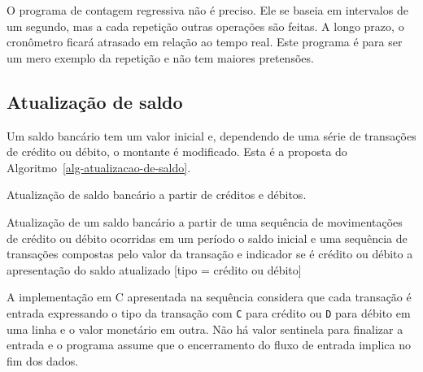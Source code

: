 \documentclass[
  11pt,
  a4paper,
]{scrbook}
\begin{document}
O programa de contagem regressiva não é preciso. Ele se baseia em
intervalos de um segundo, mas a cada repetição outras operações são
feitas. A longo prazo, o cronômetro ficará atrasado em relação ao tempo
real. Este programa é para ser um mero exemplo da repetição e não tem
maiores pretensões.

\subsection{Atualização de saldo}\label{atualizauxe7uxe3o-de-saldo}

Um saldo bancário tem um valor inicial e, dependendo de uma série de
transações de crédito ou débito, o montante é modificado. Esta é a
proposta do Algoritmo~\ref{alg-atualizacao-de-saldo}.

\begin{algorithm}[H]
\caption{\label{alg-atualizacao-de-saldo}Atualização de saldo bancário a
partir de créditos e débitos.}
\begingroup%


\begin{algorithmic}
    \Description Atualização de um saldo bancário a partir de uma sequência de movimentações de crédito ou débito ocorridas em um período
    \Require o saldo inicial e uma sequência de transações compostas pelo valor da transação e indicador se é crédito ou débito
    \Ensure a apresentação do saldo atualizado
    \Statex{}
        [tipo = crédito ou débito]
    \EndWhile
\end{algorithmic}

\endgroup
\end{algorithm}

A implementação em C apresentada na sequência considera que cada
transação é entrada expressando o tipo da transação com \texttt{C} para
crédito ou \texttt{D} para débito em uma linha e o valor monetário em
outra. Não há valor sentinela para finalizar a entrada e o programa
assume que o encerramento do fluxo de entrada implica no fim dos dados.
\end{document}
